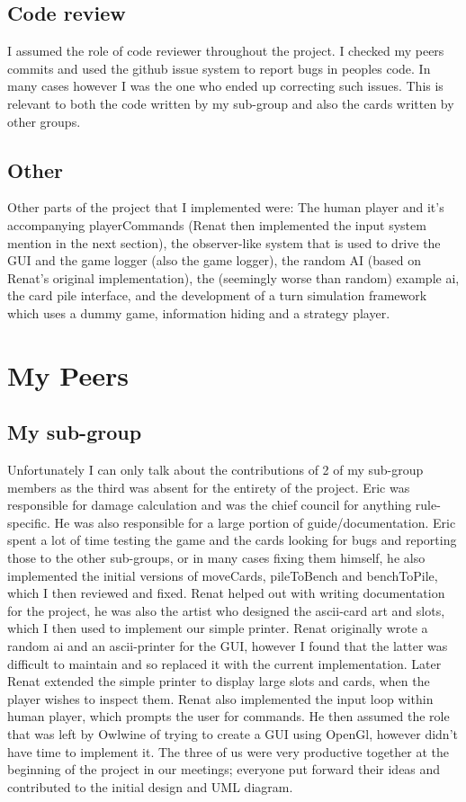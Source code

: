 \documentclass[a4paper]{article}
\begin{document}
\subsection{Code review}
I assumed the role of code reviewer throughout the project. I checked my peers commits and used the github issue system to report bugs in peoples code. In many cases however I was the one who ended up correcting such issues. This is relevant to both the code written by my sub-group and also the cards written by other groups.

\subsection{Other}
Other parts of the project that I implemented were: The human player and it's accompanying playerCommands (Renat then implemented the input system mention in the next section), the observer-like system that is used to drive the GUI and the game logger (also the game logger), the random AI (based on Renat's original implementation), the (seemingly worse than random) example ai, the card pile interface, and the development of a turn simulation framework which uses a dummy game, information hiding and a strategy player.

\section{My Peers}
\subsection{My sub-group}
Unfortunately I can only talk about the contributions of 2 of my sub-group members as the third was absent for the entirety of the project.
Eric was responsible for damage calculation and was the chief council for anything rule-specific. He was also responsible for a large portion of guide/documentation. Eric spent a lot of time testing the game and the cards looking for bugs and reporting those to the other sub-groups, or in many cases fixing them himself, he also implemented the initial versions of moveCards, pileToBench and benchToPile, which I then reviewed and fixed. Renat helped out with writing documentation for the project, he was also the artist who designed the ascii-card art and slots, which I then used to implement our simple printer. Renat originally wrote a random ai and an ascii-printer for the GUI, however I found that the latter was difficult to maintain and so replaced it with the current implementation. Later Renat extended the simple printer to display large slots and cards, when the player wishes to inspect them. Renat also implemented the input loop within human player, which prompts the user for commands. He then assumed the role that was left by Owlwine of trying to create a GUI using OpenGl, however didn't have time to implement it. The three of us were very productive together at the beginning of the project in our meetings; everyone put forward their ideas and contributed to the initial design and UML diagram.
\end{document}
